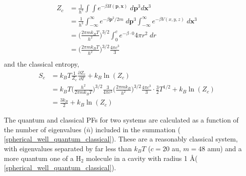 \documentclass[../main.tex]{subfiles}
\begin{document}
\begin{equation}
\begin{aligned}
Z_c &= \frac{1}{h^{3}}\int\int e^{-\beta H(\boldsymbol{p}, \boldsymbol{x})} \; d\boldsymbol{p}^{3} d\boldsymbol{x}^{3} \\
&= \frac{1}{h^{3}}\int_{-\infty}^\infty e^{-\beta \boldsymbol{p}^2/2m} \; d\boldsymbol{p}^{3} \int_{-\infty}^\infty e^{-\beta V(x, y, z)} \;  d\boldsymbol{x}^{3} \\
&= {\Big (} \frac{2\pi m k_B T}{h^2} {\Big )}^{3/2}  \int_0^c e^{-\beta \cdot 0}  4\pi r^2\;  dr \\
&= {\Big (} \frac{2\pi m k_B T}{h^2} {\Big )}^{3/2} \frac{4\pi c^3}{3} \\
\end{aligned}
\end{equation}
and the classical entropy,
\begin{equation}
\begin{aligned}
S_c &= k_B T \frac{1}{Z_c} \frac{\partial Z_c}{\partial T} + k_B \ln(Z_c) \\
&= k_B T {\Big (} \frac{h^2}{2\pi m k_B T} {\Big )}^{3/2} \frac{3}{4\pi c^3} {\Big (} \frac{2\pi m k_B}{h^2} {\Big )}^{3/2} \frac{4\pi c^3}{3}\cdot \frac{3}{2}T^{1/2} + k_B \ln(Z_c) \\
&= \frac{3k_B}{2} + k_B \ln(Z_c)
\end{aligned}
\end{equation}

The quantum and classical PFs for two systems are calculated as a function of the number of eigenvalues ($\bar{n}$) included in the summation (\figurename{ \ref{spherical_well_quantum_classical}}). These are a reasonably classical system, with eigenvalues separated by far less than $k_BT$ ($c = 20$ au, $m = 48$ amu) and a more quantum one of a H$_2$ molecule in a cavity with radius 1 \AA (\figurename{ \ref{spherical_well_quantum_classical}}).
\end{document}
